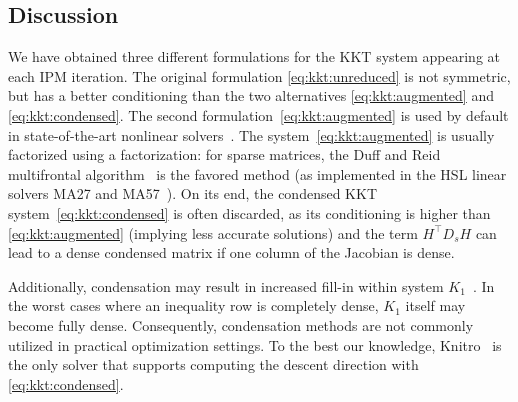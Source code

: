 \subsection{Discussion}

We have obtained three different formulations for the KKT system
appearing at each IPM iteration.
The original formulation \eqref{eq:kkt:unreduced} is not symmetric, but
has a better conditioning than the two alternatives \eqref{eq:kkt:augmented}
and \eqref{eq:kkt:condensed}.
The second formulation~\eqref{eq:kkt:augmented} is
used by default in state-of-the-art nonlinear solvers~\cite{wachter2006implementation,waltz2006interior}.
The system~\eqref{eq:kkt:augmented} is usually factorized using a \lblt factorization: for sparse matrices, the Duff and Reid
multifrontal algorithm~\cite{duff1983multifrontal} is the favored method (as implemented in the HSL linear solvers MA27 and MA57~\cite{duff2004ma57}).
On its end, the condensed KKT system~\eqref{eq:kkt:condensed} is often discarded,
as its conditioning is higher
than \eqref{eq:kkt:augmented} (implying less accurate solutions)
and the term $H^\top D_s H$ can lead to a dense condensed matrix if one column
of the Jacobian is dense.

Additionally, condensation may result in increased fill-in within system $K_1$~\cite[Section 19.3, p.571]{nocedal_numerical_2006}.
In the worst cases where an inequality row is completely dense, $K_1$ itself may become fully dense.
Consequently, condensation methods are not commonly utilized in practical optimization settings.
To the best our knowledge, Knitro~\cite{waltz2006interior} is the only solver that supports computing the descent direction with \eqref{eq:kkt:condensed}.

